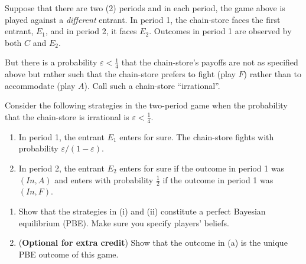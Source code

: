 \documentclass[11pt]{article}
\begin{document}
\begin{enumerate}[itemsep=1em]
    Suppose that there are two (2) periods and in each period, the game above is played against a \emph{different} entrant. In period 1, the chain-store faces the first entrant, $E_1$, and in period 2, it faces $E_2$. Outcomes in period 1 are observed by both $C$ and $E_2$.

    But there is a probability $\varepsilon < \tfrac{1}{4}$ that the chain-store's payoffs are not as specified above but rather such that the chain-store prefers to fight (play $F$) rather than to accommodate (play $A$). Call such a chain-store ``irrational''.

    Consider the following strategies in the two-period game when the probability that the chain-store is irrational is $\varepsilon < \tfrac{1}{4}$.
    \begin{enumerate}[label=(\roman*), itemsep=0.2em, topsep=0.3em]
      \item In period 1, the entrant $E_1$ enters for sure. The chain-store fights with probability $\varepsilon/(1 - \varepsilon)$.
      \item In period 2, the entrant $E_2$ enters for sure if the outcome in period 1 was $(\textit{In}, A)$ and enters with probability $\tfrac{1}{2}$ if the outcome in period 1 was $(\textit{In}, F)$.
    \end{enumerate}
    \begin{enumerate}[label=(\alph*), itemsep=0.4em, topsep=0.4em]
      \item Show that the strategies in (i) and (ii) constitute a perfect Bayesian equilibrium (PBE). Make sure you specify players' beliefs.
      \item (\textbf{Optional for extra credit}) Show that the outcome in (a) is the unique PBE outcome of this game.
    \end{enumerate}

\end{enumerate}
\end{document}

